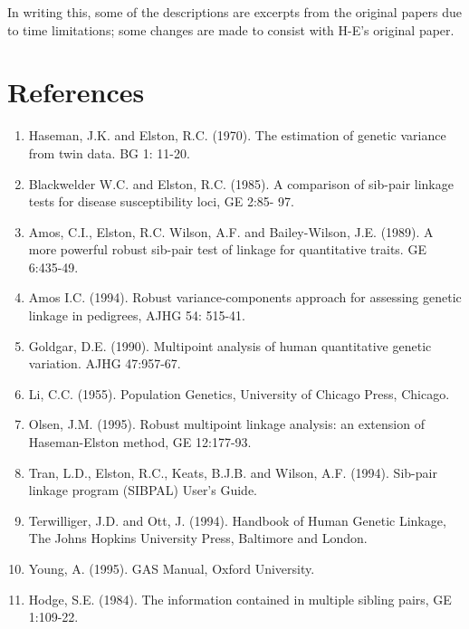 In writing this, some of the descriptions are excerpts from the original papers
due to time limitations; some changes are made to consist with H-E's original
paper.

\section*{References}

\begin{enumerate}

\item Haseman, J.K.  and Elston, R.C.  (1970).  The estimation of genetic
variance from twin data.  BG 1:  11-20.

\item Blackwelder W.C.  and Elston, R.C.  (1985).  A comparison of sib-pair
linkage tests for disease susceptibility loci, GE 2:85- 97.

\item Amos, C.I., Elston, R.C.  Wilson, A.F.  and Bailey-Wilson, J.E.  (1989).
A more powerful robust sib-pair test of linkage for quantitative traits.  GE
6:435-49.

\item Amos I.C.  (1994).  Robust variance-components approach for assessing
genetic linkage in pedigrees, AJHG 54:  515-41.

\item Goldgar, D.E.  (1990).  Multipoint analysis of human quantitative genetic
variation.  AJHG 47:957-67.

\item Li, C.C. (1955). Population Genetics, University of Chicago Press,
Chicago.

\item Olsen, J.M.  (1995).  Robust multipoint linkage analysis:  an extension
of Haseman-Elston method, GE 12:177-93.

\item Tran, L.D., Elston, R.C., Keats, B.J.B.  and Wilson, A.F.  (1994).
Sib-pair linkage program (SIBPAL) User's Guide.

\item Terwilliger, J.D.  and Ott, J.  (1994).  Handbook of Human Genetic
Linkage, The Johns Hopkins University Press, Baltimore and London.

\item Young, A. (1995). GAS Manual, Oxford University.

\item Hodge, S.E.  (1984).  The information contained in multiple sibling
pairs, GE 1:109-22.


\end{enumerate}
